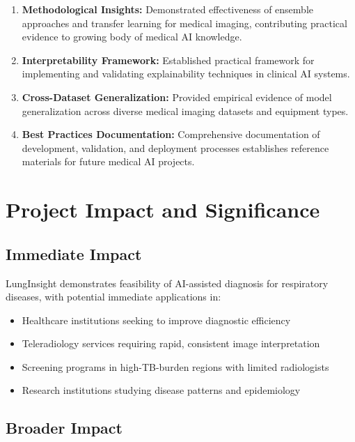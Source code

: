 {\begin{enumerate}
    \item \textbf{Methodological Insights:} Demonstrated effectiveness of ensemble approaches and transfer learning for medical imaging, contributing practical evidence to growing body of medical AI knowledge.
    
    \item \textbf{Interpretability Framework:} Established practical framework for implementing and validating explainability techniques in clinical AI systems.
    
    \item \textbf{Cross-Dataset Generalization:} Provided empirical evidence of model generalization across diverse medical imaging datasets and equipment types.
    
    \item \textbf{Best Practices Documentation:} Comprehensive documentation of development, validation, and deployment processes establishes reference materials for future medical AI projects.
\end{enumerate}

\section{Project Impact and Significance}

\subsection{Immediate Impact}

LungInsight demonstrates feasibility of AI-assisted diagnosis for respiratory diseases, with potential immediate applications in:

\begin{itemize}
    \item Healthcare institutions seeking to improve diagnostic efficiency
    \item Teleradiology services requiring rapid, consistent image interpretation
    \item Screening programs in high-TB-burden regions with limited radiologists
    \item Research institutions studying disease patterns and epidemiology
\end{itemize}

\subsection{Broader Impact}

}
